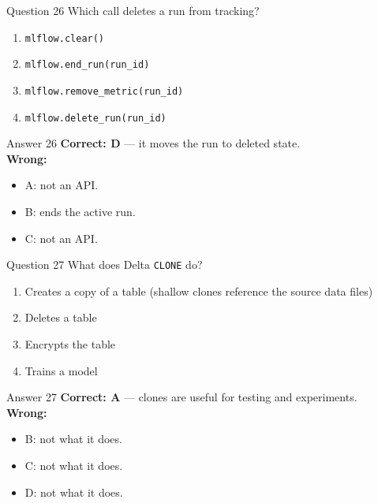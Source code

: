 \documentclass[aspectratio=169,11pt]{beamer}
\begin{document}
\begin{frame}{Question 26}
Which call deletes a run from tracking?
\begin{enumerate}[label=\Alph*.]
\item \texttt{mlflow.clear()}
\item \texttt{mlflow.end\_run(run\_id)}
\item \texttt{mlflow.remove\_metric(run\_id)}
\item \texttt{mlflow.delete\_run(run\_id)}
\end{enumerate}
\end{frame}
\begin{frame}{Answer 26}
\textbf{Correct: D} --- it moves the run to deleted state.\\
\vspace{0.5em}
\textbf{Wrong:}
\begin{itemize}
\item A: not an API.
\item B: ends the active run.
\item C: not an API.
\end{itemize}
\end{frame}

\begin{frame}{Question 27}
What does Delta \texttt{CLONE} do?
\begin{enumerate}[label=\Alph*.]
\item Creates a copy of a table (shallow clones reference the source data files)
\item Deletes a table
\item Encrypts the table
\item Trains a model
\end{enumerate}
\end{frame}
\begin{frame}{Answer 27}
\textbf{Correct: A} --- clones are useful for testing and experiments.\\
\vspace{0.5em}
\textbf{Wrong:}
\begin{itemize}
\item B: not what it does.
\item C: not what it does.
\item D: not what it does.
\end{itemize}
\end{frame}
\end{document}
